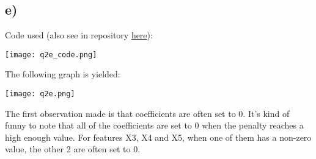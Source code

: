 \documentclass{article}
\begin{document}

\newpage
\subsection*{e)}

Code used (also see in repository \href{https://github.com/william-coulter/COMP9417_Homework_1/tree/master/python}{here}):

\texttt{[image: q2e\_code.png]}

\newpage
The following graph is yielded:

\texttt{[image: q2e.png]}

The first observation made is that coefficients are often set to 0. It's kind of funny to note that 
all of the coefficients are set to 0 when the penalty reaches a high enough value.
For features X3, X4 and X5, when one of them has a non-zero value, the other 
2 are often set to 0.






\end{document}
